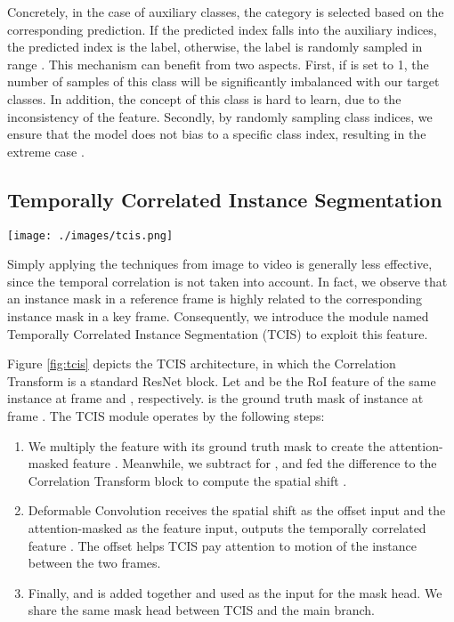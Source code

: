\documentclass[10pt,twocolumn,letterpaper]{article}
\begin{document}
Concretely, in the case of auxiliary classes, the category is selected based on the corresponding prediction. If the predicted index falls into the auxiliary indices, the predicted index is the label, otherwise, the label is randomly sampled in range . This mechanism can benefit from two aspects. First, if  is set to 1, the number of samples of this class will be significantly imbalanced with our target classes. In addition, the concept of this class is hard to learn, due to the inconsistency of the feature. Secondly, by randomly sampling class indices, we ensure that the model does not bias to a specific class index, resulting in the extreme case .



 \subsection{Temporally Correlated Instance Segmentation}
\label{sec:tcis}

\begin{figure*}[]
	\centering
	\texttt{[image: ./images/tcis.png]}
	\caption{\small Illustration of TCIS module (best viewed in color). Step 1 computes attention-masked feature  and spatial shift  as the feature  and deformable-offsets inputs, which are fed to the deformable convolution to compute correlated feature  in Step 2. Step3 predicts mask for the instance in the reference frame.}
	\label{fig:tcis}
\end{figure*}

Simply applying the techniques from image to video is generally less effective, since the temporal correlation is not taken into account. In fact, we observe that an instance mask in a reference frame is highly related to the corresponding instance mask in a key frame. Consequently, we introduce the module named Temporally Correlated Instance Segmentation (TCIS) to exploit this feature.

Figure \ref{fig:tcis} depicts the TCIS architecture, in which the Correlation Transform is a standard ResNet block. Let  and  be the RoI feature of the same instance  at frame  and , respectively.  is the ground truth mask of instance  at frame . The TCIS module operates by the following steps:

\begin{enumerate}
	\item We multiply the feature  with its ground truth mask  to create the attention-masked feature .  Meanwhile, we subtract  for , and fed the difference to the Correlation Transform block to compute the spatial shift .

	\item Deformable Convolution \cite{Dai2017} receives the spatial shift  as the offset input and the attention-masked  as the feature input, outputs the temporally correlated feature . The offset  helps TCIS pay attention to motion of the instance  between the two frames.

	\item Finally,  and  is added together and used as the input for the mask head. We share the same mask head between TCIS and the main branch.
\end{enumerate}
\end{document}
